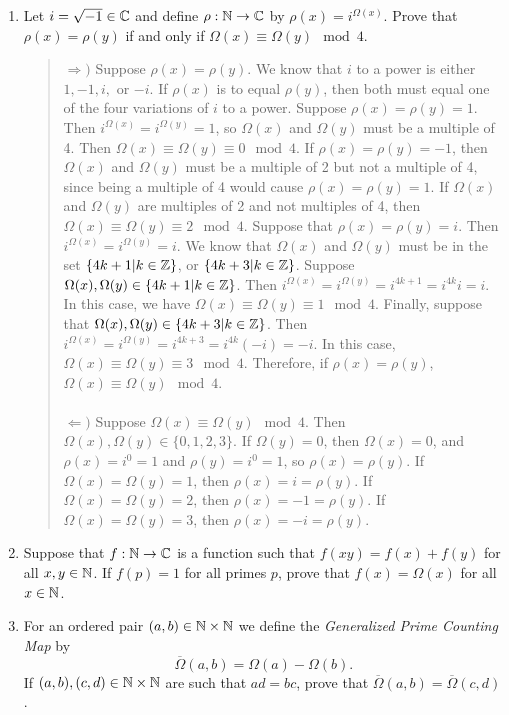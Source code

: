 \documentclass{hw}
\begin{document}
\begin{enumerate}
\item Let $i=\sqrt{-1}\in\mathbb{C}$ and define $\rho:\mathbb{N}\to\mathbb{C}$ by $\rho(x)=i^{\Omega(x)}$. Prove that
$\rho(x)=\rho(y)$ if and only if $\Omega(x)\equiv\Omega(y)\mod4$.
\begin{quote}
$\Rightarrow)$ Suppose $\rho(x)=\rho(y)$. We know that $i$ to a power is either $1,-1,i,$ or $-i$.
If $\rho(x)$ is to equal $\rho(y)$, then both must equal one of the four variations of $i$ to a
power. Suppose $\rho(x)=\rho(y)=1$. Then $i^{\Omega(x)}=i^{\Omega(y)}=1$, so $\Omega(x)$ and
$\Omega(y)$ must be a multiple of 4. Then $\Omega(x)\equiv\Omega(y)\equiv0\mod4$. If
$\rho(x)=\rho(y)=-1$, then $\Omega(x)$ and $\Omega(y)$ must be a multiple of 2 but not a multiple
of 4, since being a multiple of 4 would cause $\rho(x)=\rho(y)=1$. If $\Omega(x)$ and $\Omega(y)$
are multiples of 2 and not multiples of 4, then $\Omega(x)\equiv\Omega(y)\equiv2\mod4$. Suppose that
$\rho(x)=\rho(y)=i$. Then $i^{\Omega(x)}=i^{\Omega(y)}=i$. We know that $\Omega(x)$ and $\Omega(y)$
must be in the set $\{ 4k+1|k\in\mathbb{Z}\}$, or $\{ 4k+3|k\in\mathbb{Z}\}$. Suppose
$\Omega(x),\Omega(y)\in\{ 4k+1|k\in\mathbb{Z}\}$. Then $i^{\Omega(x)}=i^{\Omega(y)}=i^{4k+1}=i^{4k}i=i$.
In this case, we have $\Omega(x)\equiv\Omega(y)\equiv1\mod4$. Finally, suppose that
$\Omega(x),\Omega(y)\in\{ 4k+3|k\in\mathbb{Z}\}$. Then $i^{\Omega(x)}=i^{\Omega(y)}=i^{4k+3}=i^{4k}(-i)=-i$.
In this case, $\Omega(x)\equiv\Omega(y)\equiv3\mod4$. Therefore, if $\rho(x)=\rho(y)$,
$\Omega(x)\equiv\Omega(y)\mod4$.\\\\

$\Leftarrow)$ Suppose $\Omega(x)\equiv\Omega(y)\mod4$. Then $\Omega(x),\Omega(y)\in\{0,1,2,3\}$.
If $\Omega(y)=0$, then $\Omega(x)=0$, and $\rho(x)=i^{0}=1$ and $\rho(y)=i^{0}=1$, so $\rho(x)=\rho(y)$.
If $\Omega(x)=\Omega(y)=1$, then  $\rho(x)=i=\rho(y)$. If $\Omega(x)=\Omega(y)=2$, then
$\rho(x)=-1=\rho(y)$. If $\Omega(x)=\Omega(y)=3$, then $\rho(x)=-i=\rho(y)$.
\end{quote}

\item Suppose that $f:\mathbb{N}\to\mathbb{C}$ is a function such that $f(xy)=f(x)+f(y)$ for all $x,y\in\mathbb{N}$. If
$f(p)=1$ for all primes $p$, prove that $f(x)=\Omega(x)$ for all $x\in\mathbb{N}$.

\item For an ordered pair $(a,b)\in\mathbb{N}\times\mathbb{N}$ we define the \textit{Generalized Prime Counting Map}
by \[\overline{\Omega}(a,b)=\Omega(a)-\Omega(b).\] If $(a,b),(c,d)\in\mathbb{N}\times\mathbb{N}$ are such that
$ad=bc$, prove that $\overline{\Omega}(a,b)=\overline{\Omega}(c,d)$.


\end{enumerate}
\end{document}
